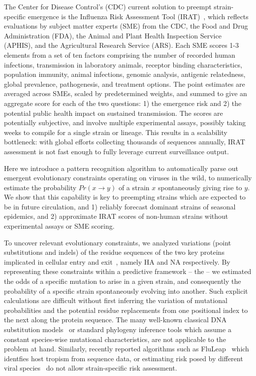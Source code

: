 \documentclass[onecolumn, compsoc,10pt]{IEEEtran}
\begin{document}
The Center for Disease Control's (CDC) current solution to preempt strain-specific emergence  is the Influenza Risk Assessment Tool (IRAT)~\cite{Influenz24:online},
which reflects evaluations%
by subject matter experts (SME) from the CDC, the Food and Drug Administration (FDA), the Animal and Plant Health Inspection Service (APHIS), and the Agricultural Research Service (ARS). Each SME scores 1-3 elements from a set of ten factors comprising the number of recorded human infections, transmission in laboratory animals, receptor binding characteristics, population immunity, animal infections, genomic analysis, antigenic relatedness, global prevalence,  pathogenesis, and  treatment options. The point estimates  are averaged across SMEs, scaled by predetermined weights, and summed to give an aggregate score for each of the two questions: 1) the emergence  risk and 2) the potential public health impact on sustained transmission. The scores  are potentially subjective, and  involve multiple experimental assays, possibly taking  weeks to compile for a single strain or lineage. This results in  a scalability bottleneck: with   global  efforts   collecting  thousands of sequences annually,  IRAT assessment is  not fast enough to fully leverage  current surveillance output.

Here we introduce a pattern recognition algorithm to automatically parse out emergent evolutionary constraints operating on \infl viruses in the wild, to numerically estimate the probability $Pr(x \rightarrow y)$ of a strain $x$ spontaneously giving rise to  $y$. We show that this capability is key to preempting  strains which are expected to be in future circulation, and  1) reliably forecast dominant strains of seasonal epidemics, and 2) approximate IRAT scores of non-human strains without  experimental assays or  SME scoring.

To uncover relevant evolutionary constraints, we analyzed  variations (point substitutions and indels) of the  residue  sequences  of the two key proteins implicated  in cellular entry and exit~\cite{gamblin2010influenza,shao2017evolution}, namely HA and NA respectively. By representing these constraints within a predictive framework -- the \enet -- we estimated the  odds of a specific mutation to arise in a given strain, and consequently the probability of a specific strain spontaneously  evolving into another.  Such explicit calculations are difficult  without first inferring the %
variation of mutational probabilities and the potential residue replacements from one positional index to the next along the protein sequence. The many well-known classical  DNA  substitution models~\cite{posada1998modeltest} or standard phylogeny inference tools which assume a constant species-wise mutational characteristics,  are not applicable to the problem at hand. Similarly, recently reported algorithms such  as FluLeap~\cite{eng2014predicting}  which identfies host tropism from sequence data, or estimating risk posed by different viral species~\cite{grange2021ranking} do not allow strain-specific risk assessment.
\end{document}
